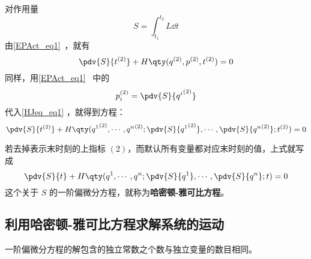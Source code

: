 
对作用量
\begin{equation}
S=\int_{t_1}^{t_2}L\dd t
\end{equation}
由\autoref{EPAct_eq1}~，就有
\begin{equation}\label{HJeq_eq1}
\pdv{S}{t^{(2)}}+H\qty(q^{(2)},p^{(2)},t^{(2)})=0
\end{equation}
同样，用\autoref{EPAct_eq1}~ 中的
\begin{equation}
p_i^{(2)}=\pdv{S}{{q^i}^{(2)}}
\end{equation}
代入\autoref{HJeq_eq1} ，就得到方程：
\begin{equation}
\pdv{S}{t^{(2)}}+H\qty({q^1}^{(2)},\cdots,{q^n}^{(2)};\pdv{S}{{q^1}^{(2)}},\cdots,\pdv{S}{{q^n}^{(2)}};t^{(2)})=0
\end{equation}

若去掉表示末时刻的上指标 $(2)$，而默认所有变量都对应末时刻的值，上式就写成
\begin{equation}
\pdv{S}{t}+H\qty({q^1},\cdots,{q^n};\pdv{S}{{q^1}},\cdots,\pdv{S}{{q^n}};t)=0
\end{equation}
这个关于 $S$ 的一阶偏微分方程，就称为\textbf{哈密顿-雅可比方程}。
\subsection{利用哈密顿-雅可比方程求解系统的运动}
一阶偏微分方程的解包含的独立常数之个数与独立变量的数目相同。